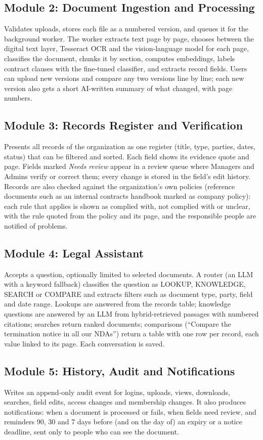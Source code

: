 \subsection{Module 2: Document Ingestion and Processing}
Validates uploads, stores each file as a numbered version, and queues it for the background worker.
The worker extracts text page by page, chooses between the digital text layer, Tesseract OCR and the
vision-language model for each page, classifies the document, chunks it by section, computes
embeddings, labels contract clauses with the fine-tuned classifier, and extracts record fields.
Users can upload new versions and compare any two versions line by line; each new version also gets a
short AI-written summary of what changed, with page numbers.

\subsection{Module 3: Records Register and Verification}
Presents all records of the organization as one register (title, type, parties, dates, status) that
can be filtered and sorted. Each field shows its evidence quote and page. Fields marked
\emph{Needs review} appear in a review queue where Managers and Admins verify or correct them; every
change is stored in the field's edit history. Records are also checked against the organization's own
policies (reference documents such as an internal contracts handbook marked as company policy): each rule
that applies is shown as complied with, not complied with or unclear, with the rule quoted from the policy
and its page, and the responsible people are notified of problems.

\subsection{Module 4: Legal Assistant}
Accepts a question, optionally limited to selected documents. A router (an LLM with a keyword fallback)
classifies the question as LOOKUP, KNOWLEDGE, SEARCH or COMPARE and extracts filters such as document type,
party, field and date range. Lookups are answered from the records table; knowledge questions are
answered by an LLM from hybrid-retrieved passages with numbered citations; searches return ranked
documents; comparisons (``Compare the termination notice in all our NDAs'') return a table with one row
per record, each value linked to its page. Each conversation is saved.

\subsection{Module 5: History, Audit and Notifications}
Writes an append-only audit event for logins, uploads, views, downloads, searches, field edits, access
changes and membership changes. It also produces notifications: when a document is processed or fails,
when fields need review, and reminders 90, 30 and 7 days before (and on the day of) an expiry or a
notice deadline, sent only to people who can see the document.


